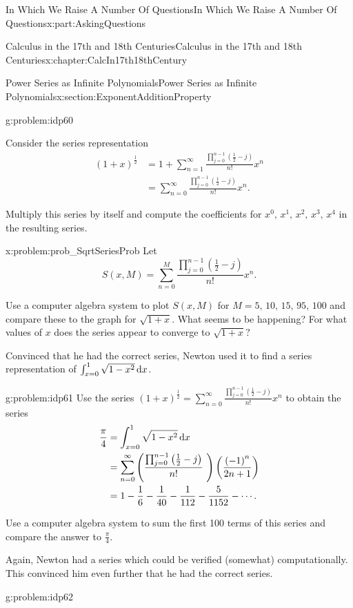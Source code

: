 \documentclass[oneside,10pt,]{book}
\numberwithin{equation}{section}
\newcommand{\dx}[1]{\,{\rm d}#1}
\newcommand{\amp}{&}
\begin{document}
\begin{partptx}{In Which We Raise A Number Of Questions}{}{In Which We Raise A Number Of Questions}{}{}{x:part:AskingQuestions}
\begin{chapterptx}{Calculus in the 17th and 18th Centuries}{}{Calculus in the 17th and 18th Centuries}{}{}{x:chapter:CalcIn17th18thCentury}
\begin{sectionptx}{Power Series as Infinite Polynomials}{}{Power Series as Infinite Polynomials}{}{}{x:section:ExponentAdditionProperty}
\begin{problem}{}{g:problem:idp60}
\par
Consider the series representation%
\begin{align*}
\left(1+x\right)^{\frac{1}{2}}\amp =1+\sum_{n=1}^\infty\frac{\prod_{j=0}^{n-1}\left(\frac{1}{2}-j\right)}{n!}x^n\\
\amp  =\sum_{n=0}^\infty\frac{\prod_{j=0}^{n-1}\left(\frac{1}{2}-j\right)}{n!}x^n\text{.}
\end{align*}
%
\par
Multiply this series by itself and compute the coefficients for \(x^0,\,x^1,\,x^2,\,x^3,\,x^4\) in the resulting series.%
\end{problem}
\begin{problem}{}{x:problem:prob_SqrtSeriesProb}%
 Let%
\begin{equation*}
S(x,M)=\sum_{n=0}^M\frac{\prod_{j=0}^{n-1}\left(\frac{1}{2}-j \right)}{n!}x^n\text{.}
\end{equation*}
%
\par
Use a computer algebra system to plot \(S(x,M)\) for \(M=5,\,10,\,15,\,95,\,100\) and compare these to the graph for \(\sqrt{1+x}\). What seems to be happening? For what values of \(x\) does the series appear to converge to \(\sqrt{1+x}?\)%
\end{problem}
Convinced that he had the correct series, Newton used it to find a series representation of \(\int_{x=0}^1\sqrt{1-x^2} \dx{ x}\).%
\begin{problem}{}{g:problem:idp61}%
 Use the series \(\displaystyle \left(1+x\right)^{\frac{1}{2}}=\sum_{n=0}^\infty\frac{\prod_{j=0}^{n-1}\left(\frac{1}{2}-j\right)}{n!}x^n\) to obtain the series%
\begin{align*}
\frac{\pi}{4}\amp =\int_{x=0}^1\sqrt{1-x^2} \dx{ x}\\
\amp =\sum_{n=0}^\infty\left(\frac{\prod_{j=0}^{n-1}\left(\frac{1}{2}-j\right)}{n!}\text{ } \right)\left(\frac{\left(-1\right)^n}{2n+1}\right)\\
\amp =1-\frac{1}{6}-\frac{1}{40}-\frac{1}{112}-\frac{5}{1152}-\cdots\text{.}
\end{align*}
%
\par
Use a computer algebra system to sum the first 100 terms of this series and compare the answer to \(\frac{\pi}{4}\).%
\end{problem}
Again, Newton had a series which could be verified (somewhat) computationally. This convinced him even further that he had the correct series.%
\begin{problem}{}{g:problem:idp62}%

\end{problem}
\end{sectionptx}
\end{chapterptx}
\end{partptx}
\end{document}
